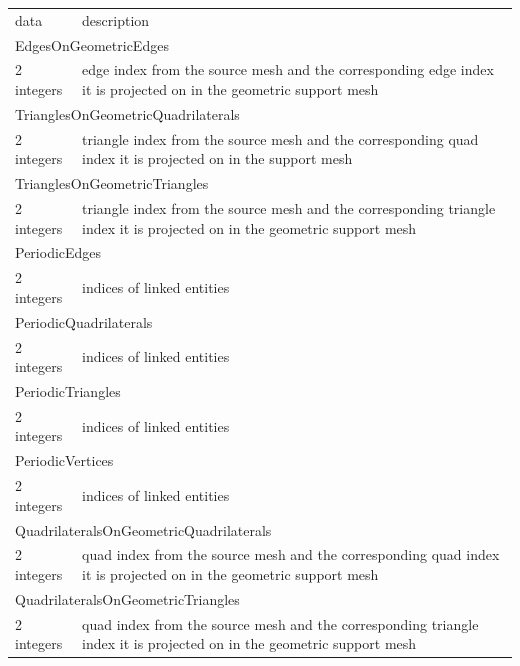 \documentclass[a4paper,12pt]{article}
\begin{document}
\setlongtables
\begin{longtable}{|m{4cm}|m{11cm}|}
\endhead
\endfoot

\hline
\multicolumn{2}{|l|}{keyword} \\
\hline
data & description \\
\hline\hline

\multicolumn{2}{|l|}{EdgesOnGeometricEdges} \\
\hline
2 integers & edge index from the source mesh and the corresponding edge index it is projected on in the geometric support mesh \\
\hline\hline

\multicolumn{2}{|l|}{TrianglesOnGeometricQuadrilaterals} \\
\hline
2 integers & triangle index from the source mesh and the corresponding quad index it is projected on in the support mesh \\
\hline\hline

\multicolumn{2}{|l|}{TrianglesOnGeometricTriangles} \\
\hline
2 integers & triangle index from the source mesh and the corresponding triangle index it is projected on in the geometric support mesh \\
\hline\hline

\multicolumn{2}{|l|}{PeriodicEdges} \\
\hline
2 integers & indices of linked entities \\
\hline\hline

\multicolumn{2}{|l|}{PeriodicQuadrilaterals} \\
\hline
2 integers & indices of linked entities \\
\hline\hline

\multicolumn{2}{|l|}{PeriodicTriangles} \\
\hline
2 integers & indices of linked entities \\
\hline\hline

\multicolumn{2}{|l|}{PeriodicVertices} \\
\hline
2 integers & indices of linked entities \\
\hline\hline

\multicolumn{2}{|l|}{QuadrilateralsOnGeometricQuadrilaterals} \\
\hline
2 integers & quad index from the source mesh and the corresponding quad index it is projected on in the geometric support mesh \\
\hline\hline

\multicolumn{2}{|l|}{QuadrilateralsOnGeometricTriangles} \\
\hline
2 integers & quad index from the source mesh and the corresponding triangle index it is projected on in the geometric support mesh \\
\hline\hline


\end{longtable}
\end{document}
